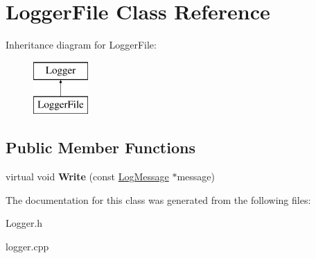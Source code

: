 \hypertarget{class_logger_file}{\section{Logger\-File Class Reference}
\label{class_logger_file}
}
Inheritance diagram for Logger\-File\-:\begin{figure}[H]
\begin{center}
\leavevmode
\includegraphics[height=2.000000cm]{class_logger_file}
\end{center}
\end{figure}
\subsection*{Public Member Functions}
\begin{DoxyCompactItemize}
\item 
\hypertarget{class_logger_file_a010eb0025beb001f6c5b81adad572d21}{virtual void {\bfseries Write} (const \hyperlink{class_log_message}{Log\-Message} $\ast$message)}\label{class_logger_file_a010eb0025beb001f6c5b81adad572d21}

\end{DoxyCompactItemize}


The documentation for this class was generated from the following files\-:\begin{DoxyCompactItemize}
\item 
Logger.\-h\item 
logger.\-cpp\end{DoxyCompactItemize}
